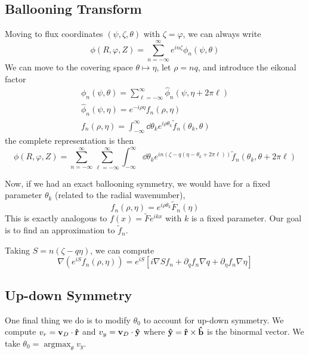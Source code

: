 \documentclass[]{article}
\begin{document}
\subsection{Ballooning Transform}

Moving to flux coordinates \((\psi, \zeta, \theta)\) with \(\zeta=\varphi\), we can always write
\begin{equation*}
	\phi(R,\varphi,Z) = \sum_{n=-\infty}^{\infty} e^{i n \zeta} \phi_n(\psi,\theta)
\end{equation*}
We can move to the covering space \(\theta \mapsto \eta\), let \(\rho = nq\), and introduce the eikonal factor
\begin{gather*}
	\phi_n(\psi, \theta) = \sum_{\ell=-\infty}^{\infty} \hat{\phi}_n(\psi, \eta + 2 \pi \ell) \\
	\hat{\phi}_n(\psi, \eta) = e^{-i\rho\eta} f_n(\rho,\eta) \\
	f_n(\rho, \eta) = \int_{-\infty}^{\infty} \dd{\theta_k} e^{i\rho\theta_k} \tilde{f}_n(\theta_k, \theta)
\end{gather*}
the complete representation is then
\begin{equation*}
	\phi(R,\varphi,Z) = \sum_{n=-\infty}^{\infty} \sum_{\ell = -\infty}^{\infty} \int_{-\infty}^{\infty} \dd{\theta}_k e^{in(\zeta - q(\eta - \theta_k + 2 \pi \ell))} \tilde{f}_n(\theta_k, \theta + 2 \pi \ell)
\end{equation*}

Now, if we had an exact ballooning symmetry, we would have for a fixed parameter \(\theta_k\) (related to the radial wavenumber),
\begin{equation*}
	f_n(\rho,\eta) = e^{i\rho\theta_k} \tilde{F}_n(\eta)
\end{equation*}
This is exactly analogous to \(f(x) = \tilde{F} e^{ikx}\) with \(k\) is a fixed parameter.
Our goal is to find an approximation to \(\tilde{f}_n\).

Taking \(S=n(\zeta - q \eta)\), we can compute
\begin{equation*}
	\nabla (e^{iS} f_n(\rho, \eta)) = e^{iS} \left[i\nabla S f_n + \partial_q f_n \nabla q + \partial_\eta f_n \nabla \eta\right]
\end{equation*}

\subsection{Up-down Symmetry}
One final thing we do is to modify \(\theta_0\) to account for up-down symmetry.
We compute \(v_r = \vb{v}_D \cdot \vu{r}\) and \(v_y = \vb{v}_D \cdot \vu{y}\) where \(\vu{y} = \vu{r} \times \vu{b}\) is the binormal vector.
We take \(\theta_0 = \operatorname{argmax}_{\theta} v_y\).
\end{document}
